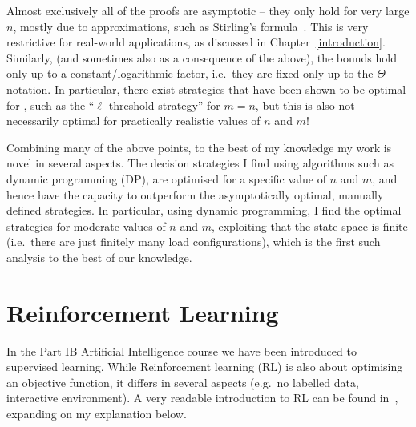 \begin{itemize}
    Almost exclusively all of the proofs are asymptotic -- they only hold for very large $n$, mostly due to approximations, such as Stirling's formula~\cite{feldheim2021thinning}. This is very restrictive for real-world applications, as discussed in Chapter~\ref{introduction}. Similarly, (and sometimes also as a consequence of the above), the bounds hold only up to a constant/logarithmic factor, i.e.\ they are fixed only up to the $\Theta$ notation. In particular, there exist strategies that have been shown to be optimal for \TwoThinning, such as the ``$\ell$-threshold strategy'' for $m=n$, but this is also not necessarily optimal for practically realistic values of $n$ and $m$! 
    \fi
\end{itemize}

Combining many of the above points, to the best of my knowledge my work is novel in several aspects. The decision strategies I find using algorithms such as dynamic programming (DP), are optimised for a specific value of $n$ and $m$, and hence have the capacity to outperform the asymptotically optimal, manually defined strategies. In particular, using dynamic programming, I find the optimal strategies for moderate values of $n$ and $m$, exploiting that the state space is finite (i.e.\ there are just finitely many load configurations), which is the first such analysis to the best of our knowledge.


\section{Reinforcement Learning} \label{RLintro}


In the Part IB Artificial Intelligence course we have been introduced to supervised learning. While Reinforcement learning (RL) is also about optimising an objective function, it differs in several aspects (e.g.\ no labelled data, interactive environment). A very readable introduction to RL can be found in~\cite{sutton2018RLbook}, expanding on my explanation below.



